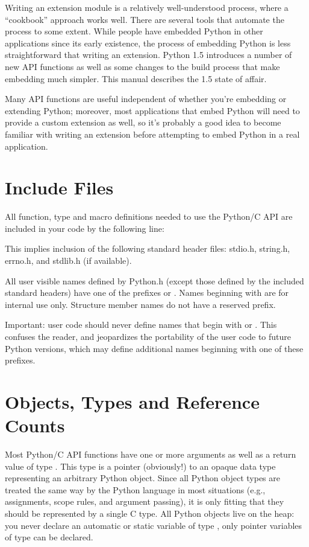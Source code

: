 Writing an extension module is a relatively well-understood process, 
where a ``cookbook'' approach works well.  There are several tools 
that automate the process to some extent.  While people have embedded 
Python in other applications since its early existence, the process of 
embedding Python is less straightforward that writing an extension.  
Python 1.5 introduces a number of new API functions as well as some 
changes to the build process that make embedding much simpler.  
This manual describes the 1.5 state of affair.

Many API functions are useful independent of whether you're embedding 
or extending Python; moreover, most applications that embed Python 
will need to provide a custom extension as well, so it's probably a 
good idea to become familiar with writing an extension before 
attempting to embed Python in a real application.

\section{Include Files}

All function, type and macro definitions needed to use the Python/C
API are included in your code by the following line:


This implies inclusion of the following standard header files:
stdio.h, string.h, errno.h, and stdlib.h (if available).

All user visible names defined by Python.h (except those defined by
the included standard headers) have one of the prefixes  or
.  Names beginning with  are for internal use
only.  Structure member names do not have a reserved prefix.

Important: user code should never define names that begin with
 or .  This confuses the reader, and jeopardizes
the portability of the user code to future Python versions, which may
define additional names beginning with one of these prefixes.

\section{Objects, Types and Reference Counts}

Most Python/C API functions have one or more arguments as well as a
return value of type .  This type is a pointer
(obviously!)  to an opaque data type representing an arbitrary Python
object.  Since all Python object types are treated the same way by the
Python language in most situations (e.g., assignments, scope rules,
and argument passing), it is only fitting that they should be
represented by a single C type.  All Python objects live on the heap:
you never declare an automatic or static variable of type
, only pointer variables of type  can 
be declared.

